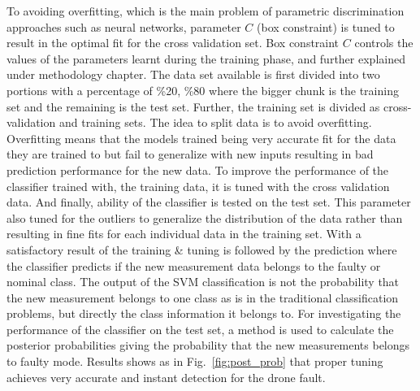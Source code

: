 To avoiding overfitting, which is the main problem of parametric discrimination approaches such as neural networks, parameter $C$ (box constraint) is tuned to result in the optimal fit for the cross validation set. Box constraint $C$ controls the values of the parameters learnt during the training phase, and further explained under methodology chapter.
The data set available is first divided into two portions with a percentage of \%20, \%80 where the bigger chunk is the training set and the remaining is the test set. 
Further, the training set is divided as cross-validation and training sets. 
The idea to split data is to avoid overfitting. 
Overfitting means that the models trained being very accurate fit for the data they are trained to but fail to generalize with new inputs resulting in bad prediction performance for the new data. 
To improve the performance of the classifier trained with, the training data, it is tuned with the cross validation data. 
And finally, ability of the classifier is tested on the test set. 
This parameter also tuned for the outliers to generalize the distribution of the data rather than resulting in fine fits for each individual data in the training set. 
With a satisfactory result of the training \& tuning is followed by the prediction where the classifier predicts if the new measurement data belongs to the faulty or nominal class. 
The output of the SVM classification is not the probability that the new measurement belongs to one class as is in the traditional classification problems, but directly the class information it belongs to. 
For investigating the performance of the classifier on the test set, a method \cite{platt1999probabilistic} is used to calculate the posterior probabilities giving the probability that the new measurements belongs to faulty mode. 
Results shows as in  Fig.~\ref{fig:post_prob} that proper tuning achieves very accurate and instant detection for the drone fault. 
   

